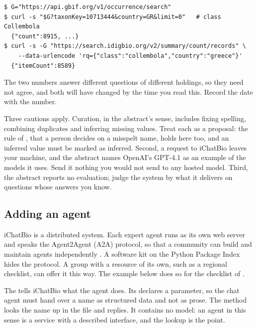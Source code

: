 \documentclass[11pt,a4paper]{article}
\begin{document}
\begin{lstlisting}[style=shell,caption={The counts, asked of the sources directly (11 November 2026)}]
$ G="https://api.gbif.org/v1/occurrence/search"
$ curl -s "$G?taxonKey=10713444&country=GR&limit=0"   # class Collembola
  {"count":8915, ...}
$ curl -s -G "https://search.idigbio.org/v2/summary/count/records" \
    --data-urlencode 'rq={"class":"collembola","country":"greece"}'
  {"itemCount":8589}
\end{lstlisting}

The two numbers answer different questions of different holdings, so they
need not agree, and both will have changed by the time you read this. Record
the date with the number.

Three cautions apply. Curation, in the abstract's sense, includes fixing
spelling, combining duplicates and inferring missing values. Treat each as a
proposal: the rule of \Cref{sec:session}, that a person decides on a misspelt
name, holds here too, and an inferred value must be marked as inferred.
Second, a request to iChatBio leaves your machine, and the abstract names
OpenAI's GPT-4.1 as an example of the models it uses. Send it nothing you
would not send to any hosted model. Third, the abstract reports no
evaluation; judge the system by what it delivers on questions whose answers
you know.

\subsection*{Adding an agent}

iChatBio is a distributed system. Each expert agent runs as its own web
server and speaks the Agent2Agent (A2A) protocol, so that a community can
build and maintain agents independently \parencite{elliott2025ichatbio}. A
software kit on the Python Package Index hides the protocol. A group with a
resource of its own, such as a regional checklist, can offer it this way. The
example below does so for the checklist of \Cref{sec:session}.



The  tells iChatBio what the agent does. Its
 declares a parameter, so the chat agent must hand over a
name as structured data and not as prose. The \code{run} method looks the
name up in the file and replies. It contains no model: an agent in this sense
is a service with a described interface, and the lookup is the point.
\end{document}
